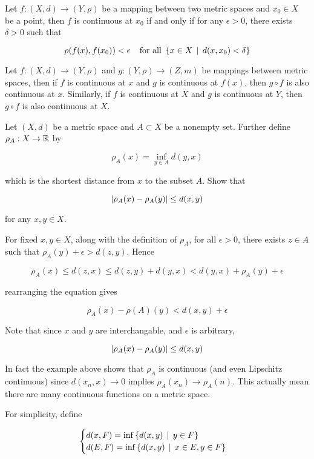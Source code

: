 \documentclass[a4paper,12pt]{article}
\begin{document}
\begin{pst}
  Let $f:(X,d)\to(Y,\rho)$ be a mapping between two metric spaces and $x_{0}\in X$ be a point, then $f$ is continuous at $x_{0}$ if and only if for any $\epsilon>0$, there exists $\delta>0$ such that

  $$\rho(f(x),f(x_{0}))<\epsilon\;\;\;\;\text{for all }\left\{ x\in X\,\mid\, d(x,x_{0})<\delta\right\}$$
\end{pst}\n

\begin{pst}
  Let $f:(X,d)\to(Y,\rho)$ and $g:(Y,\rho)\to(Z,m)$ be mappings between metric spaces, then if $f$ is continuous at $x$ and $g$ is continuous at $f(x)$, then $g\circ f$ is also continuous at $x$. Similarly, if $f$ is continuous at $X$ and $g$ is continuous at $Y$, then $g\circ f$ is also continuous at $X$.
\end{pst}\n

\begin{exm}
  Let $(X,d)$ be a metric space and $A\subset X$ be a nonempty set. Further define $\rho_{A}:X\to\mathbb{R}$ by

  $$\rho_{A}(x)=\underset{y\in A}{\inf}d(y,x)$$\s

  which is the shortest distance from $x$ to the subset $A$. Show that

  $$\left| \rho_{A}(x)-\rho_{A}(y)\right|\leq d(x,y)$$\s

  for any $x,y\in X$.\n

  \ans For fixed $x,y\in X$, along with the definition of $\rho_{A}$, for all $\epsilon>0$, there exists $z\in A$ such that $\rho_{A}(y)+\epsilon>d(z,y)$. Hence

  $$\rho_{A}(x)\leq d(z,x)\leq d(z,y)+d(y,x)<d(y,x)+\rho_{A}(y)+\epsilon$$

  rearranging the equation gives

  $$\rho_{A}(x)-\rho(A)(y)<d(x,y)+\epsilon$$\s

  Note that since $x$ and $y$ are interchangable, and $\epsilon$ is arbitrary,

  $$\left| \rho_{A}(x)-\rho_{A}(y)\right|\leq d(x,y)$$
\end{exm}\n

In fact the example above shows that $\rho_{A}$ is continuous (and even Lipschitz continuous) since $d(x_{n},x)\to 0$ implies $\rho_{A}(x_{n})\to\rho_{A}(n)$. This actually mean there are many continuous functions on a metric space.\n

For simplicity, define

$$\begin{cases}
  d(x,F)=\inf\left\{ d(x,y)\,\mid\, y\in F\right\}\\
  d(E,F)=\inf\left\{ d(x,y)\,\mid\, x\in E,y\in F\right\}
\end{cases}$$\s
\end{document}
